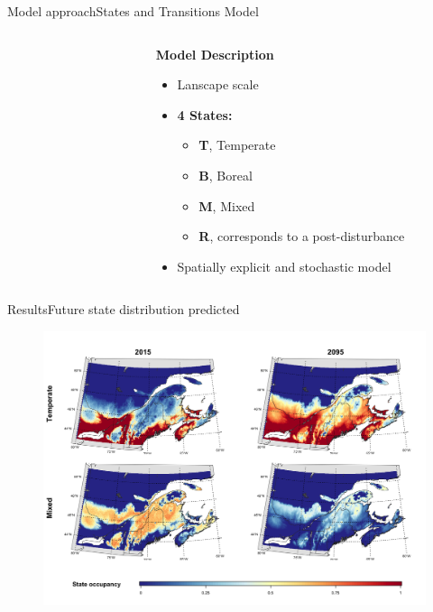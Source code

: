 \documentclass[10pt,aspectratio=149]{beamer}
\begin{document}
\begin{frame}{Model approach}{States and Transitions Model}

\begin{columns}[t]
	\begin{column}[t]{.40\paperwidth}
		\begin{figure}
			\small{}
		\end{figure}
	\end{column}
	\begin{column}{.50\paperwidth}
	\textbf{Model Description}
		\begin{itemize}
			\item Lanscape scale
			\item \textbf{4 States:}
			\begin{itemize}
				\item \textcolor{Temperate}{\textbf{T}}, Temperate
				\item \textcolor{Boreal}{\textbf{B}}, Boreal
				\item \textcolor{Mixed}{\textbf{M}}, Mixed
				\item \textcolor{Regeneration}{\textbf{R}}, corresponds to a post-disturbance
			\end{itemize}
			\item Spatially explicit and stochastic model
		\end{itemize}
	\end{column}
\end{columns}

\end{frame}


\begin{frame}{Results}{Future state distribution predicted}

  \begin{figure}
  	\includegraphics[width=.75\paperwidth]{Figs/future_distrib_states.png}
  \end{figure}

\end{frame}
\end{document}
